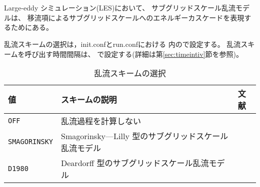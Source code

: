 \section{\SubsecTurbulenceSetting} \label{sec:basic_usel_turbulence}

Large-eddy シミュレーション(LES)において、
サブグリッドスケール乱流モデルは、
移流項によるサブグリッドスケールへのエネルギーカスケードを表現するためにある。

乱流スキームの選択は，init.confとrun.confにおける
内ので設定する。
乱流スキームを呼び出す時間間隔は、
で設定する(詳細は第\ref{sec:timeintiv}節を参照)。

\begin{table}[h]
\begin{center}
  \caption{乱流スキームの選択}
  \label{tab:nml_atm_tb}
  \begin{tabularx}{150mm}{lXX} \hline
    \rowcolor[gray]{0.9}  値 & スキームの説明 & 文献\\ \hline
      \verb|OFF|          & 乱流過程を計算しない &  \\
      \verb|SMAGORINSKY|  & Smagorinsky—Lilly 型のサブグリッドスケール乱流モデル & \citet{smagorinsky_1963,lilly_1962,Brown_etal_1994,Scotti_1993} \\
      \verb|D1980|        & Deardorff 型のサブグリッドスケール乱流モデル & \citet{Deardorff_1980} \\
    \hline
  \end{tabularx}
\end{center}
\end{table}

